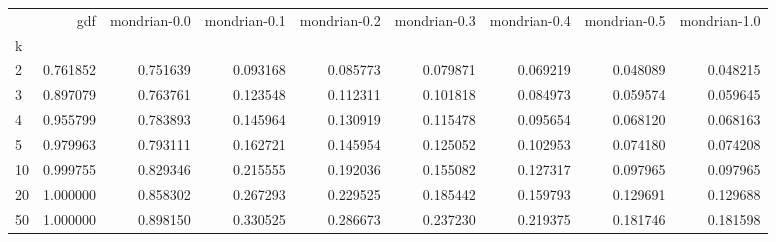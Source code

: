 \begin{tabular}{lrrrrrrrr}
\toprule
{} &       gdf &  mondrian-0.0 &  mondrian-0.1 &  mondrian-0.2 &  mondrian-0.3 &  mondrian-0.4 &  mondrian-0.5 &  mondrian-1.0 \\
k  &           &               &               &               &               &               &               &               \\
\midrule
2  &  0.761852 &      0.751639 &      0.093168 &      0.085773 &      0.079871 &      0.069219 &      0.048089 &      0.048215 \\
3  &  0.897079 &      0.763761 &      0.123548 &      0.112311 &      0.101818 &      0.084973 &      0.059574 &      0.059645 \\
4  &  0.955799 &      0.783893 &      0.145964 &      0.130919 &      0.115478 &      0.095654 &      0.068120 &      0.068163 \\
5  &  0.979963 &      0.793111 &      0.162721 &      0.145954 &      0.125052 &      0.102953 &      0.074180 &      0.074208 \\
10 &  0.999755 &      0.829346 &      0.215555 &      0.192036 &      0.155082 &      0.127317 &      0.097965 &      0.097965 \\
20 &  1.000000 &      0.858302 &      0.267293 &      0.229525 &      0.185442 &      0.159793 &      0.129691 &      0.129688 \\
50 &  1.000000 &      0.898150 &      0.330525 &      0.286673 &      0.237230 &      0.219375 &      0.181746 &      0.181598 \\
\bottomrule
\end{tabular}
